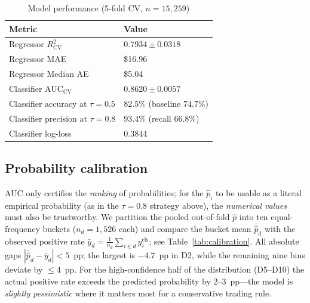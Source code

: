 \documentclass[sigconf,nonacm,10pt]{acmart}
\begin{document}
\begin{table}[h]
  \centering
  \small
  \caption{Model performance (5-fold CV, $n=15{,}259$)}
  \label{tab:model}
  \begin{tabular}{ll}
    \toprule
    \textbf{Metric} & \textbf{Value} \\
    \midrule
    Regressor $R^2_{\text{CV}}$              & $0.7934 \pm 0.0318$ \\
    Regressor MAE                            & \$16.96 \\
    Regressor Median AE                      & \$5.04 \\
    Classifier AUC$_{\text{CV}}$             & $0.8620 \pm 0.0057$ \\
    Classifier accuracy at $\tau=0.5$        & $82.5\%$ (baseline $74.7\%$) \\
    Classifier precision at $\tau=0.8$       & $93.4\%$ (recall $66.8\%$) \\
    Classifier log-loss                      & $0.3844$ \\
    \bottomrule
  \end{tabular}
\end{table}

\subsection{Probability calibration}

AUC only certifies the \emph{ranking} of probabilities; for the
$\hat p_i$ to be usable as a literal empirical probability (as in the
$\tau=0.8$ strategy above), the \emph{numerical values} must also be
trustworthy. We partition the pooled out-of-fold $\hat p$ into ten
equal-frequency buckets ($n_d=1{,}526$ each) and compare the bucket
mean $\bar{\hat p}_d$ with the observed positive rate
$\bar y_d=\tfrac{1}{n_d}\sum_{i\in d} y^{\text{cls}}_i$; see
Table~\ref{tab:calibration}. All absolute gaps
$|\bar{\hat p}_d-\bar y_d|<5$~pp; the largest is $-4.7$~pp in D2,
while the remaining nine bins deviate by $\leq 4$~pp. For the
high-confidence half of the distribution (D5--D10) the actual
positive rate exceeds the predicted probability by $2$--$3$~pp---the
model is \emph{slightly pessimistic} where it matters most for a
conservative trading rule.
\end{document}
